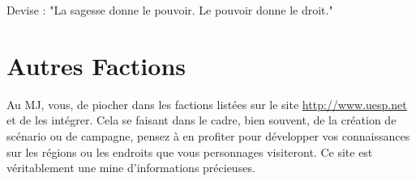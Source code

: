     Devise : "La sagesse donne le pouvoir. Le pouvoir donne le droit."

  \section{Autres Factions}
  
    Au MJ, vous, de piocher dans les factions listées sur le site \url{http://www.uesp.net} et de les intégrer. Cela se faisant dans le cadre, bien souvent, de la création de scénario ou de campagne, pensez à en profiter pour développer vos connaissances sur les régions ou les endroits que vous personnages visiteront. Ce site est véritablement une mine d'informations précieuses.
